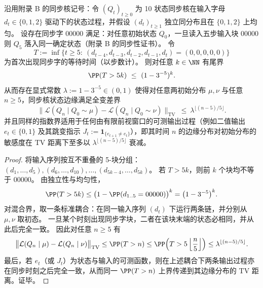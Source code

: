 \begin{proposition}[同步字等待时间给出的显式混合率]\label{prop:sync-kernel-explicit-syncword-mixing-rate}
沿用附录 B 的同步核记号：令 \((Q_t)_{t\ge 0}\) 为 10 状态同步核在输入字母 \(d_t\in\{0,1,2\}\) 驱动下的状态过程，并假设 \((d_t)_{t\ge 1}\) 独立同分布且在 \(\{0,1,2\}\) 上均匀。
设存在同步字 \(00000\) 满足：对任意初始状态 \(Q_0\)，一旦读入五步输入块 \(00000\) 则 \(Q_5\) 落入同一确定状态（附录 B 的同步性证书）。
令
\[
T:=\inf\{t\ge 5:\ (d_{t-4},d_{t-3},d_{t-2},d_{t-1},d_t)=(0,0,0,0,0)\}
\]
为首次出现同步字的等待时间（以步数计）。
则对任意 \(k\in\NN\) 有尾界
\[
\PP(T>5k)\ \le\ (1-3^{-5})^{k}.
\]
从而存在显式常数 \(\lambda:=1-3^{-5}\in(0,1)\) 使得对任意两初始分布 \(\mu,\nu\) 与任意 \(n\ge 5\)，同步核状态边缘满足全变差界
\[
\bigl\|\mathcal L(Q_n\mid Q_0\sim\mu)-\mathcal L(Q_n\mid Q_0\sim\nu)\bigr\|_{\mathrm{TV}}
\ \le\
\lambda^{\lfloor (n-5)/5\rfloor}.
\]
并且同样的指数界适用于任何由有限前视窗口的可测输出过程（例如二值输出 \(e_t\in\{0,1\}\) 及其跳变指示 \(J_t:=\mathbf 1_{\{e_{t+1}\ne e_t\}}\)），即其时间 \(n\) 的边缘分布对初始分布的敏感度在 \(\mathrm{TV}\) 距离下至多以 \(\lambda^{\lfloor (n-5)/5\rfloor}\) 衰减。
\end{proposition}
\begin{proof}
将输入序列按互不重叠的 5-块分组：
\((d_1,\dots,d_5),(d_6,\dots,d_{10}),\dots,(d_{5k-4},\dots,d_{5k})\)。
若 \(T>5k\)，则前 \(k\) 个块均不等于 \(00000\)。
由独立性与均匀性，
\[
\PP(T>5k)\le \bigl(1-\PP(d_{1..5}=00000)\bigr)^k=\bigl(1-3^{-5}\bigr)^k.
\]
对混合界，取一条标准耦合：在同一输入序列 \((d_t)\) 下运行两条链，并分别从 \(\mu,\nu\) 取初态。
一旦某个时刻出现同步字块，二者在该块末端的状态必相同，并从此后完全一致。
因此对任意 \(n\ge 5\) 有
\[
\bigl\|\mathcal L(Q_n\mid \mu)-\mathcal L(Q_n\mid \nu)\bigr\|_{\mathrm{TV}}
\le \PP(T>n)
\le \PP\!\left(T>5\left\lfloor\frac{n}{5}\right\rfloor\right)
\le \lambda^{\lfloor (n-5)/5\rfloor}.
\]
最后，若 \(e_t\)（或 \(J_t\)）为状态与输入的可测函数，则在上述耦合下两条输出过程亦在同步时刻之后完全一致，从而同一 \(\PP(T>n)\) 上界传递到其边缘分布的 \(\mathrm{TV}\) 距离。证毕。
\end{proof}

